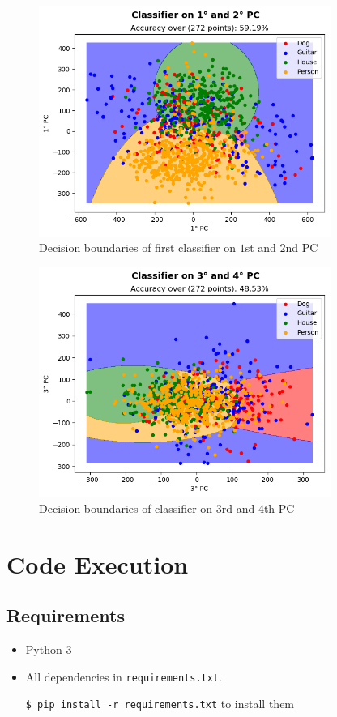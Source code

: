 \documentclass[a4paper, 11pt]{article}
\begin{document}
	\begin{figure}[ht!]
		\centering
		\includegraphics[width=0.85\textwidth]{img/fig04.png}
		\caption{Decision boundaries of first classifier on $1$st and $2$nd PC}
		\label{fig:class1}
	\end{figure}
	\begin{figure}[ht!]
		\centering
		\includegraphics[width=0.85\textwidth]{img/fig05.png}
		\caption{Decision boundaries of classifier on $3$rd and $4$th PC}
		\label{fig:class2}
	\end{figure}
	
	
	\section{Code Execution}
	\subsection{Requirements}
	\begin{itemize}
		\item Python 3
		\item All dependencies in \texttt{requirements.txt}.
		
		\texttt{\$ pip install -r requirements.txt} to install them
	\end{itemize}
\end{document}
